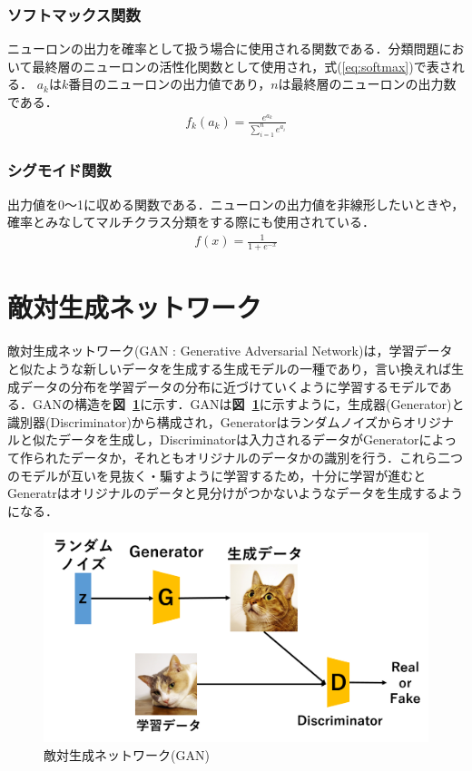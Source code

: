 \documentclass[a4j, 11pt]{jreport}
\newcommand{\figref}[1]{\textbf{図~\ref{#1}}}
\newcommand{\eref}[1]{式(\ref{#1})}
\begin{document}
\subsubsection{ソフトマックス関数}
ニューロンの出力を確率として扱う場合に使用される関数である．分類問題において最終層のニューロンの活性化関数として使用され，\eref{eq:softmax}で表される．
$a_k$は$k$番目のニューロンの出力値であり，$n$は最終層のニューロンの出力数である．
\begin{eqnarray}
	f_k(a_k) = \frac{e^{a_k}}{\displaystyle \sum_{i=1}^{n} e^{a_i}} \label{eq:softmax}
\end{eqnarray}

\subsubsection{シグモイド関数}
出力値を0～1に収める関数である．ニューロンの出力値を非線形したいときや，確率とみなしてマルチクラス分類をする際にも使用されている．
\begin{eqnarray}
	f(x) = \frac{1}{1+ e^{-x}}
\end{eqnarray}


\newpage
\section{敵対生成ネットワーク}
敵対生成ネットワーク(GAN : Generative Adversarial Network)は，学習データと似たような新しいデータを生成する生成モデルの一種であり，言い換えれば生成データの分布を学習データの分布に近づけていくように学習するモデルである．GANの構造を\figref{fig:GAN}に示す．GANは\figref{fig:GAN}に示すように，生成器(Generator)と識別器(Discriminator)から構成され，Generatorはランダムノイズからオリジナルと似たデータを生成し，Discriminatorは入力されるデータがGeneratorによって作られたデータか，それともオリジナルのデータかの識別を行う．これら二つのモデルが互いを見抜く・騙すように学習するため，十分に学習が進むとGeneratrはオリジナルのデータと見分けがつかないようなデータを生成するようになる．\\
\begin{figure}[htbp]
	\begin{center}
		\includegraphics[scale=0.6]{./images/deeplearning/GAN.png}
		\caption{敵対生成ネットワーク(GAN)}
		\label{fig:GAN}
	\end{center}
\end{figure}
\end{document}
